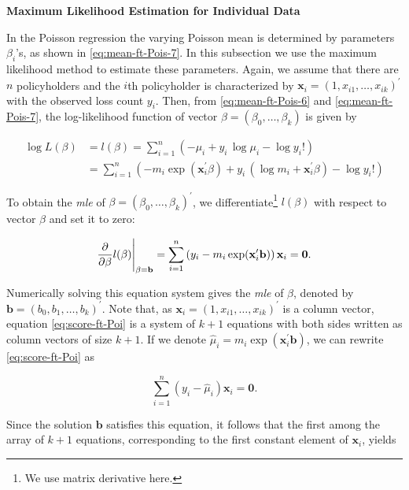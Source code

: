 \documentclass[]{book}
\let\rmarkdownfootnote\footnote%
\def\footnote{\protect\rmarkdownfootnote}
\theoremstyle{definition}
\theoremstyle{definition}
\theoremstyle{definition}
\theoremstyle{remark}
\begin{document}
\textbf{Maximum Likelihood Estimation for Individual Data}

In the Poisson regression the varying Poisson mean is determined by
parameters \(\beta_i\)'s, as shown in \eqref{eq:mean-ft-Pois-7}. In this
subsection we use the maximum likelihood method to estimate these
parameters. Again, we assume that there are \(n\) policyholders and the
\(i\)th policyholder is characterized by
\(\mathbf{ x}_i=(1, x_{i1}, \ldots, x_{ik})^{\prime}\) with the observed
loss count \(y_i\). Then, from \eqref{eq:mean-ft-Pois-6} and
\eqref{eq:mean-ft-Pois-7}, the log-likelihood function of vector
\(\beta=(\beta_0, \dots, \beta_k)\) is given by

\begin{align}
\nonumber \log L(\beta)    &= l(\beta)=\sum^n_{i=1} \left( -\mu_i +y_i \, \log \mu_i -\log y_i! \right)  \\
    &  = \sum^n_{i=1} \left( -m_i \exp(\mathbf{ x}^{\prime}_i\beta) +y_i \,(\log m_i+\mathbf{ x}^{\prime}_i\beta)  -\log y_i! \right)
\label{eq:ll-Poi-reg}
\end{align}

To obtain the \emph{mle} of
\(\beta=(\beta_0, \ldots, \beta_k)^{\prime}\), we
differentiate\footnote{We use matrix derivative here.} \(l(\beta)\) with
respect to vector \(\beta\) and set it to zero:

\begin{equation}
\frac{\partial}{\partial \beta}l(\beta)\Bigg{|}_{\beta=\mathbf{b}}=\sum^n_{i=1} \left(y_i -m_i \exp(\mathbf{ x}^{\prime}_i \mathbf{ b}) \right)\mathbf{ x}_i=\mathbf{ 0}.
\label{eq:score-ft-Poi}
\end{equation}

Numerically solving this equation system gives the \emph{mle} of
\(\beta\), denoted by \(\mathbf{ b}=(b_0, b_1, \ldots, b_k)^{\prime}\).
Note that, as \(\mathbf{ x}_i=(1, x_{i1}, \ldots, x_{ik})^{\prime}\) is
a column vector, equation \eqref{eq:score-ft-Poi} is a system of \(k+1\)
equations with both sides written as column vectors of size \(k+1\). If
we denote \(\hat{\mu}_i=m_i \exp(\mathbf{ x}^{\prime}_i \mathbf{ b})\),
we can rewrite \eqref{eq:score-ft-Poi} as

\begin{equation}
\sum^n_{i=1} \left(y_i -\hat{\mu}_i \right)\mathbf{ x}_i=\mathbf{ 0}.
\end{equation}

Since the solution \(\mathbf{ b}\) satisfies this equation, it follows
that the first among the array of \(k+1\) equations, corresponding to
the first constant element of \(\mathbf{ x}_i\), yields
\end{document}
